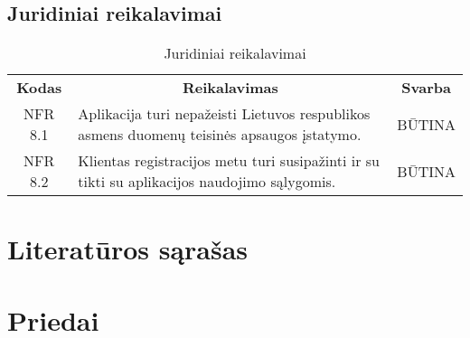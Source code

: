 \documentclass{VUMIFPSkursinis}
\begin{document}
\subsection{Juridiniai reikalavimai}
\begin{center}
	\begin{table}[H]
	\begin{tabular}{|p{2cm}|p{}|p{}|}
	\hline
	    \rowcolor{lightgray}
		\multicolumn{3}{|c|}{Juridiniai reikalavimai}\\
		
	\hline
		\multicolumn{1}{|c|}{{\bfseries Kodas}}&
		\multicolumn{1}{|c|}{{\bfseries Reikalavimas}}&
		\multicolumn{1}{|c|}{{\bfseries Svarba}}\\
	\hline 	
		\multicolumn{1}{|c|}{NFR 8.1}&
		{Aplikacija turi nepažeisti Lietuvos respublikos asmens duomenų teisinės apsaugos įstatymo.}&
		\multicolumn{1}{|c|}{BŪTINA}\\	
	
	\hline 	
		\multicolumn{1}{|c|}{NFR 8.2}&
		{Klientas registracijos metu turi susipažinti ir su tikti su aplikacijos naudojimo sąlygomis.}&
		\multicolumn{1}{|c|}{BŪTINA}\\	
	
	\hline 	
	\end{tabular}
	\caption{Juridiniai reikalavimai}
	\label{table:Juridiniaireikalavimai}
	\end{table}

\end{center}

\pagebreak

\section{Literatūros sąrašas}

\section{Priedai}
\end{document}
